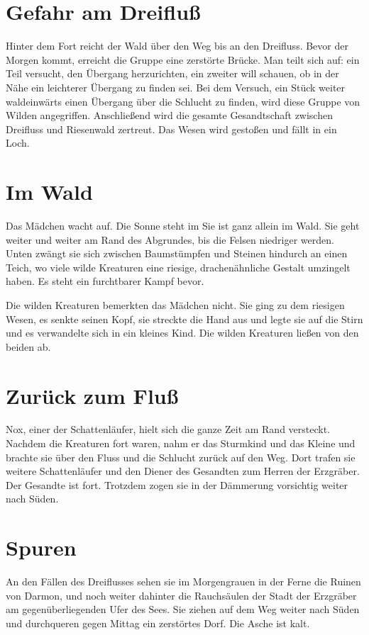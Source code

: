 \documentclass[12pt,a4paper,onecolumn,twoside,ngerman]{book}
\begin{document}
\section{Gefahr am Dreifluß}
Hinter dem Fort reicht der Wald über den Weg bis an den Dreifluss. Bevor der Morgen kommt, erreicht die Gruppe eine zerstörte Brücke. Man teilt sich auf: ein Teil versucht, den Übergang herzurichten, ein zweiter will schauen, ob in der Nähe ein leichterer Übergang zu finden sei. Bei dem Versuch, ein Stück weiter waldeinwärts einen Übergang über die Schlucht zu finden, wird diese Gruppe von Wilden angegriffen. Anschließend wird die gesamte Gesandtschaft zwischen Dreifluss und Riesenwald zertreut. Das Wesen wird gestoßen und fällt in ein Loch.

\section{Im Wald}
Das Mädchen wacht auf. Die Sonne steht im Sie ist ganz allein im Wald. Sie geht weiter und weiter am Rand des Abgrundes, bis die Felsen niedriger werden. Unten zwängt sie sich zwischen Baumstümpfen und Steinen hindurch an einen Teich, wo viele wilde Kreaturen eine riesige, drachenähnliche Gestalt umzingelt haben. Es steht ein furchtbarer Kampf bevor.

Die wilden Kreaturen bemerkten das Mädchen nicht. Sie ging zu dem riesigen Wesen, es senkte seinen Kopf, sie streckte die Hand aus und legte sie auf die Stirn und es verwandelte sich in ein kleines Kind. Die wilden Kreaturen ließen von den beiden ab.

\section{Zurück zum Fluß}
Nox, einer der Schattenläufer, hielt sich die ganze Zeit am Rand versteckt. Nachdem die Kreaturen fort waren, nahm er das Sturmkind und das Kleine und brachte sie über den Fluss und die Schlucht zurück auf den Weg. Dort trafen sie weitere Schattenläufer und den Diener des Gesandten zum Herren der Erzgräber. Der Gesandte ist fort. Trotzdem zogen sie in der Dämmerung vorsichtig weiter nach Süden.

\section{Spuren}
An den Fällen des Dreiflusses sehen sie im Morgengrauen in der Ferne die Ruinen von Darmon, und noch weiter dahinter die Rauchsäulen der Stadt der Erzgräber am gegenüberliegenden Ufer des Sees. Sie ziehen auf dem Weg weiter nach Süden und durchqueren gegen Mittag ein zerstörtes Dorf. Die Asche ist kalt.
\end{document}
